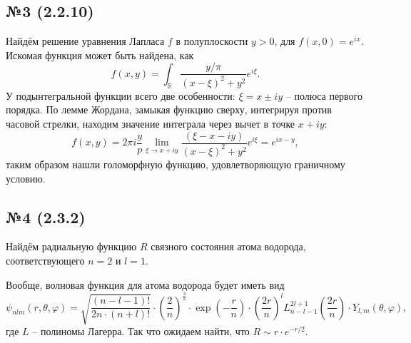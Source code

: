 \subsection*{№3 (2.2.10)}

Найдём решение уравнения Лапласа $f$ в полуплоскости $y > 0$, для $f(x, 0) = e^{ix}$. Искомая функция может быть найдена, как
\begin{equation*}
    f(x, y) = \int_{\mathbb{R}} \frac{y/\pi}{(x-\xi)^2 + y^2} e^{i \xi}.
\end{equation*}
У подынтегральной функции всего две особенности: $\xi = x \pm i y$ -- полюса первого порядка. По лемме Жордана, замыкая функцию сверху, интегрируя против часовой стрелки, находим значение интеграла через вычет в точке $x + i y$:
\begin{equation*}
    f(x, y) = 2 \pi i \frac{y}{p} \lim_{\xi \to x + i y} \frac{(\xi-x-iy)}{(x-\xi)^2 + y^2} e^{i \xi} = e^{i x - y},
\end{equation*}
таким образом нашли голоморфную функцию, удовлетворяющую граничному условию.








\subsection*{№4 (2.3.2)}

Найдём радиальную функцию $R$ связного состояния атома водорода, соответствующего $n=2$ и $l=1$. 


Вообще, волновая функция для атома водорода будет иметь вид
\begin{equation*}
    \psi _{nlm}(r,\theta ,\varphi )=\sqrt {\frac {(n-l-1)!}{2n{\cdot }(n+l)!}}{\cdot }\left({\frac{2}{n}}\right)^{\frac{3}{2}}\cdot \exp {\left({-{\frac{r}{n}}}\right)}\cdot \left({\frac {2r}{n}}\right)^{l}L_{n-l-1}^{2l+1}{\left({\frac {2r}{n}}\right)}\cdot Y_{l,m}(\theta ,\varphi ),
\end{equation*}
где $L$ -- полиномы Лагерра. Так что ожидаем найти, что $R \sim r \cdot e^{-r/2}$. 


